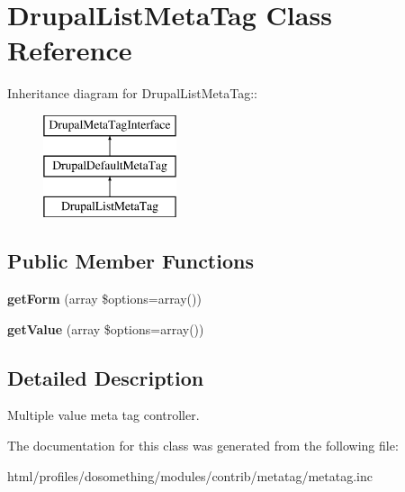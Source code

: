 \hypertarget{classDrupalListMetaTag}{
\section{DrupalListMetaTag Class Reference}
\label{classDrupalListMetaTag}
}
Inheritance diagram for DrupalListMetaTag::\begin{figure}[H]
\begin{center}
\leavevmode
\includegraphics[height=3cm]{classDrupalListMetaTag}
\end{center}
\end{figure}
\subsection*{Public Member Functions}
\begin{DoxyCompactItemize}
\item 
\hypertarget{classDrupalListMetaTag_abbbfd8d45200ee2b6d0d2fdc44f79d5b}{
{\bfseries getForm} (array \$options=array())}
\label{classDrupalListMetaTag_abbbfd8d45200ee2b6d0d2fdc44f79d5b}

\item 
\hypertarget{classDrupalListMetaTag_abefecc6239f243505118645c49c778c0}{
{\bfseries getValue} (array \$options=array())}
\label{classDrupalListMetaTag_abefecc6239f243505118645c49c778c0}

\end{DoxyCompactItemize}


\subsection{Detailed Description}
Multiple value meta tag controller. 

The documentation for this class was generated from the following file:\begin{DoxyCompactItemize}
\item 
html/profiles/dosomething/modules/contrib/metatag/metatag.inc\end{DoxyCompactItemize}
